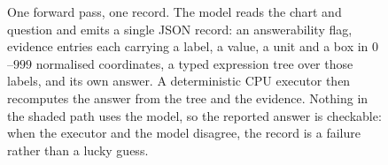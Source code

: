 \begin{figure}[t]
\centering
\caption{One forward pass, one record. The model reads the chart and question and emits a single JSON record: an answerability flag, evidence entries each carrying a label, a value, a unit and a box in $0$--$999$ normalised coordinates, a typed expression tree over those labels, and its own answer. A deterministic CPU executor then recomputes the answer from the tree and the evidence. Nothing in the shaded path uses the model, so the reported answer is checkable: when the executor and the model disagree, the record is a failure rather than a lucky guess.}
\label{fig:architecture}
\end{figure}
